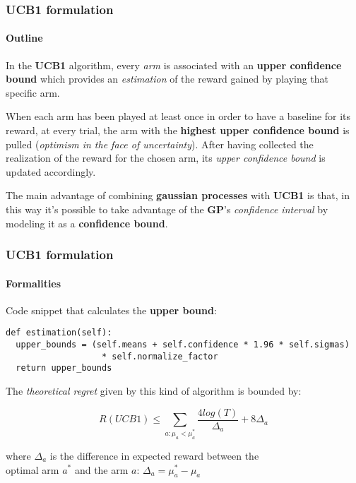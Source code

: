 \begin{frame}

\frametitle{UCB1 formulation}
\framesubtitle{Outline}

In the \textbf{UCB1} algorithm, every \textit{arm} is associated with an \textbf{upper confidence bound} which provides an \textit{estimation} of the reward gained by playing that specific arm.

When each arm has been played at least once in order to have a baseline for its reward, at every trial, the arm with the \textbf{highest upper confidence bound} is pulled (\textit{optimism in the face of uncertainty}).
After having collected the realization of the reward for the chosen arm, its \textit{upper confidence bound} is updated accordingly.

The main advantage of combining \textbf{gaussian processes} with \textbf{UCB1} is that, in this way it's possible to take advantage of the \textbf{GP}'s \textit{confidence interval} by modeling it as a \textbf{confidence bound}.

\end{frame}


\begin{frame}[fragile]

\frametitle{UCB1 formulation}
\framesubtitle{Formalities}

Code snippet that calculates the \textbf{upper bound}:

\begin{lstlisting}[style=Python, basicstyle=\tiny, numbers=none, framexrightmargin=-20pt]
def estimation(self):
  upper_bounds = (self.means + self.confidence * 1.96 * self.sigmas)
                   * self.normalize_factor
  return upper_bounds
\end{lstlisting}

The \textit{theoretical regret} given by this kind of algorithm is bounded by:

\begin{displaymath}
R(UCB1) \le \sum_{a:\mu_a < \mu_a^*} \frac{4log(T)}{\Delta_a} + 8\Delta_a
\end{displaymath}

where $\Delta_a$ is the difference in expected reward between the \\ optimal arm $a^*$ and the arm $a$: $\Delta_a = \mu_a^* - \mu_a$

\end{frame}

